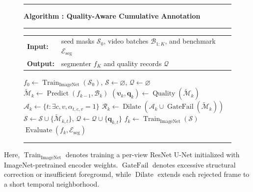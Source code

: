 \begin{figure}[t]
\label{alg:iterative-semantic-annotation}
\small
\hrule
\vspace{2pt}
\noindent\textbf{Algorithm \thetroalgorithm: Quality-Aware Cumulative Annotation}
\vspace{2pt}
\hrule
\vspace{2pt}
\begin{tabular}{@{}l@{\ }>{\raggedright\arraybackslash}p{}@{}}
\textbf{Input:} & seed masks $\mathcal S_0$, video batches $\mathcal B_{1:K}$, and benchmark $\mathcal E_{\mathrm{seg}}$\\
\textbf{Output:} & segmenter $f_K$ and quality records $\mathcal Q$\\
\end{tabular}
\begin{algorithmic}
\STATE $f_0\leftarrow\operatorname{Train}_{\mathrm{ImageNet}}(\mathcal S_0)$, $\mathcal S\leftarrow\varnothing$, $\mathcal Q\leftarrow\varnothing$
 \STATE $\widetilde{\mathcal M}_k\leftarrow\operatorname{Predict}(f_{k-1},\mathcal B_k)$
 \STATE $(\bm\upsilon_k,\bm q_k)\leftarrow\operatorname{Quality}(\widetilde{\mathcal M}_k)$
 \STATE $\mathcal A_k\leftarrow\{t:\exists c,v,\alpha_{t,c,v}=1\}$
 \STATE $\mathcal R_k\leftarrow\operatorname{Dilate}\!\left(
 \mathcal A_k\cup\operatorname{GateFail}(\widetilde{\mathcal M}_k)\right)$
   \STATE $\mathcal S\leftarrow\mathcal S\cup\{\widetilde{\mathcal M}_{k,t}\}$, $\mathcal Q\leftarrow\mathcal Q\cup\{\bm q_{k,t}\}$
  \ENDIF
 \ENDFOR
 \STATE $f_k\leftarrow\operatorname{Train}_{\mathrm{ImageNet}}(\mathcal S)$
 \STATE $\operatorname{Evaluate}(f_k,\mathcal E_{\mathrm{seg}})$
\ENDFOR
\end{algorithmic}
\hrule
\end{figure}
Here, $\operatorname{Train}_{\mathrm{ImageNet}}$ denotes training a per-view ResNet U-Net initialized with ImageNet-pretrained encoder weights.
$\operatorname{GateFail}$ denotes excessive structural correction or insufficient foreground, while $\operatorname{Dilate}$ extends each rejected frame to a short temporal neighborhood.

